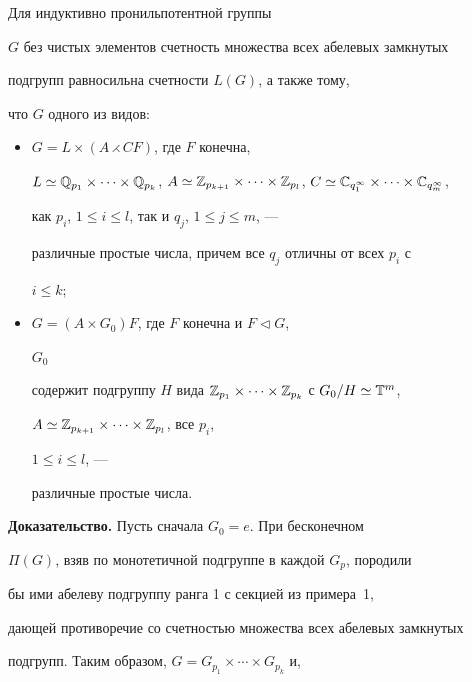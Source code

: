 \begin{thm} 


Для индуктивно пронильпотентной группы 


$G$ без чистых элементов счетность множества всех абелевых замкнутых 


подгрупп равносильна счетности $L(G)$, а также тому, 


что $G$ одного из видов${:}$ 


\begin{itemize} 


\item[1)] $G=L\times(A\rightthreetimes CF)$, где $F$ конечна, 


$L\simeq\Bbb Q_{p_1}\times\dotsb\times\Bbb Q_{p_k}$, $A\simeq\Bbb 


Z_{p_{k+1}}\times\dotsb\times\Bbb Z_{p_l}$, $C\simeq\Bbb 


C_{q^\infty_1}\times\dotsb\times\Bbb C_{q^\infty_m}$, 


как $p_i$, $1\le i\le l$, так и $q_j$, $1\le j\le m$, --- 


различные простые числа, причем все $q_j$ отличны от всех $p_i$ с 


$i\le k;$ 


\item[2)] $G=(A\times G_0)F$, где $F$ конечна и $F\triangleleft G$, 


$G_0$ 


содержит подгруппу $H$ вида $\Bbb Z_{p_1}\times\dotsb\times\Bbb 


Z_{p_k}$ с $G_0/H\simeq\Bbb T^m$, 


$A\simeq\Bbb Z_{p_{k+1}}\times\dotsb\times\Bbb Z_{p_l}$, все $p_i$, 


$1\le i\le l$, --- 


различные простые числа. 


\end{itemize} 


\end{thm} 


 


{\bf Доказательство.} Пусть сначала $G_0=e$. При бесконечном 


$\Pi(G)$, взяв по монотетичной подгруппе в каждой $G_p$, породили 


бы ими абелеву подгруппу ранга 1 с секцией из примера~1, 


дающей противоречие со счетностью множества всех абелевых замкнутых 


подгрупп. Таким образом, $G=G_{p_1}\times\dotsb\times G_{p_k}$ и, 


